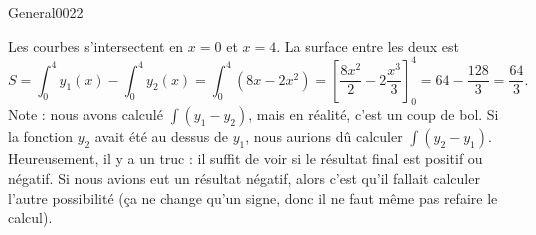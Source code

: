 \begin{corrige}{General0022}

Les courbes s'intersectent en $x=0$ et $x=4$. La surface entre les deux est
\begin{equation}
	S=\int_0^4y_1(x)-\int_0^4y_2(x)=\int_0^4(8x-2x^2)=\left[ \frac{ 8x^2 }{ 2 }-2\frac{ x^3 }{ 3 } \right]_0^4=64-\frac{ 128 }{ 3 }=\frac{ 64 }{ 3 }.
\end{equation}
Note : nous avons calculé $\int(y_1-y_2)$, mais en réalité, c'est un coup de bol. Si la fonction $y_2$ avait été au dessus de $y_1$, nous aurions dû calculer $\int(y_2-y_1)$. Heureusement, il y a un truc : il suffit de voir si le résultat final est positif ou négatif. Si nous avions eut un résultat négatif, alors c'est qu'il fallait calculer l'autre possibilité (ça ne change qu'un signe, donc il ne faut même pas refaire le calcul).

\end{corrige}
